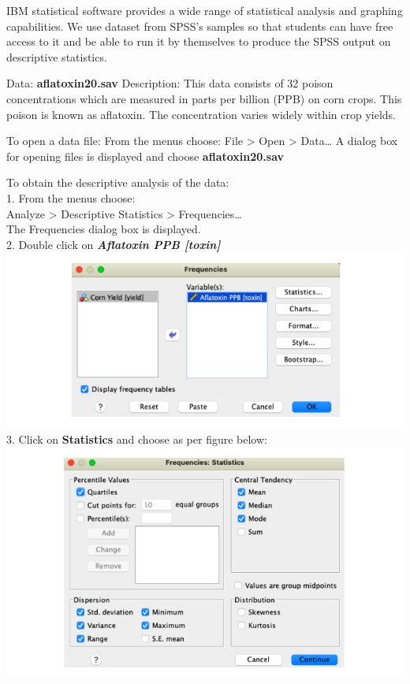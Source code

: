 \documentclass[
  a4paper,
  DIV=11,
  numbers=noendperiod,
  oneside]{scrreprt}
\begin{document}
IBM statistical software provides a wide range of statistical analysis
and graphing capabilities. We use dataset from SPSS's samples so that
students can have free access to it and be able to run it by themselves
to produce the SPSS output on descriptive statistics.

Data: \textbf{aflatoxin20.sav} Description: This data consists of 32
poison concentrations which are measured in parts per billion (PPB) on
corn crops. This poison is known as aflatoxin. The concentration varies
widely within crop yields.

To open a data file: From the menus choose: File \textgreater{} Open
\textgreater{} Data\ldots{} A dialog box for opening files is displayed
and choose \textbf{aflatoxin20.sav}

To obtain the descriptive analysis of the data:\\
1. From the menus choose:\\
Analyze \textgreater{} Descriptive Statistics \textgreater{}
Frequencies\ldots{}\\
The Frequencies dialog box is displayed.\\
2. Double click on \textbf{\emph{Aflatoxin PPB {[}toxin{]}}}\\
\includegraphics{images/ch2/picture20.png}\\
3. Click on \textbf{Statistics} and choose as per figure below:\\
\includegraphics{images/ch2/picture21.png}\\
\end{document}
